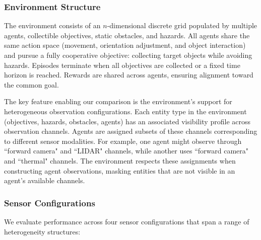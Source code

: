 \subsubsection{Environment Structure}

The environment consists of an \(n\)-dimensional discrete grid populated 
by multiple agents, collectible objectives, static obstacles, and hazards. 
All agents share the same action space (movement, orientation adjustment, 
and object interaction) and pursue a fully cooperative objective: 
collecting target objects while avoiding hazards. 
Episodes terminate when all objectives are collected or a fixed time horizon is reached. 
Rewards are shared across agents, ensuring alignment toward the common goal.

The key feature enabling our comparison is the environment's 
support for heterogeneous observation configurations. 
Each entity type in the environment (objectives, hazards, obstacles, agents) 
has an associated visibility profile across observation channels. 
Agents are assigned subsets of these channels corresponding to 
different sensor modalities. For example, one agent might 
observe through ``forward camera" and ``LIDAR" channels, 
while another uses ``forward camera" and ``thermal" channels. 
The environment respects these assignments when constructing agent observations, 
masking entities that are not visible in an agent's available channels.

\subsubsection{Sensor Configurations}

We evaluate performance across four sensor configurations that 
span a range of heterogeneity structures:

